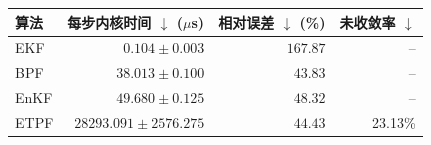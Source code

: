 \begin{tabular}{lrrr}
\toprule
算法 & 每步内核时间 $\downarrow$ ($\mu$s) & 相对误差 $\downarrow$ (\%) & 未收敛率 $\downarrow$ \\
\midrule
EKF & $\mathbf{0.104}\pm 0.003$ & $167.87$ & -- \\
BPF & $38.013\pm 0.100$ & $\mathbf{43.83}$ & -- \\
EnKF & $49.680\pm 0.125$ & $48.32$ & -- \\
ETPF & $28293.091\pm 2576.275$ & $44.43$ & 23.13\% \\
\bottomrule
\end{tabular}
